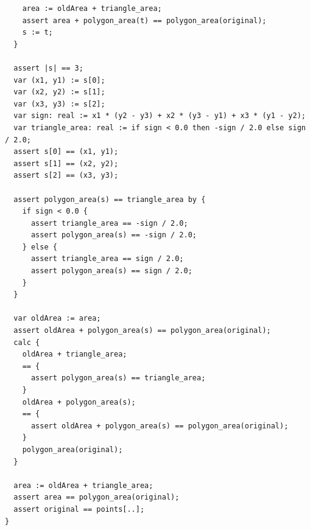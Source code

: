 \documentclass{article}
\begin{document}
\begin{lstlisting}
    area := oldArea + triangle_area;
    assert area + polygon_area(t) == polygon_area(original);
    s := t;
  }

  assert |s| == 3;
  var (x1, y1) := s[0];
  var (x2, y2) := s[1];
  var (x3, y3) := s[2];
  var sign: real := x1 * (y2 - y3) + x2 * (y3 - y1) + x3 * (y1 - y2);
  var triangle_area: real := if sign < 0.0 then -sign / 2.0 else sign / 2.0;
  assert s[0] == (x1, y1);
  assert s[1] == (x2, y2);
  assert s[2] == (x3, y3);

  assert polygon_area(s) == triangle_area by {
    if sign < 0.0 {
      assert triangle_area == -sign / 2.0;
      assert polygon_area(s) == -sign / 2.0;
    } else {
      assert triangle_area == sign / 2.0;
      assert polygon_area(s) == sign / 2.0;
    }
  }

  var oldArea := area;
  assert oldArea + polygon_area(s) == polygon_area(original);
  calc {
    oldArea + triangle_area;
    == {
      assert polygon_area(s) == triangle_area;
    }
    oldArea + polygon_area(s);
    == {
      assert oldArea + polygon_area(s) == polygon_area(original);
    }
    polygon_area(original);
  }

  area := oldArea + triangle_area;
  assert area == polygon_area(original);
  assert original == points[..];
}
\end{lstlisting}
\end{document}

